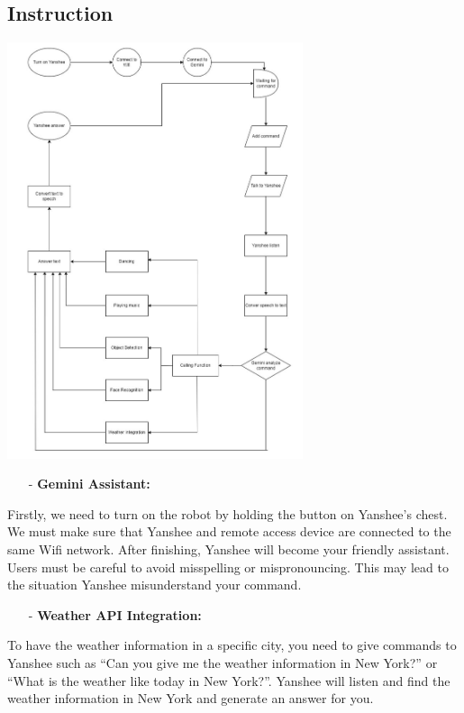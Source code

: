 \documentclass[12pt, a4paper]{article}
\begin{document}
\subsection{Instruction}
\begin{center}
    \includegraphics[width = 0.65\textwidth]{./image/4.png}
\end{center}
\begin{itemize}
    \item[-] \textbf{Gemini Assistant:}
\end{itemize}

Firstly, we need to turn on the robot by holding the button on Yanshee's chest. We must make sure that Yanshee and remote access device are connected to the same Wifi network. After finishing, Yanshee will become your friendly assistant. Users must be careful to avoid misspelling or mispronouncing. This may lead to the situation Yanshee misunderstand your command.

\begin{itemize}
    \item[-] \textbf{Weather API Integration:}
\end{itemize}

To have the weather information in a specific city, you need to give commands to Yanshee such as “Can you give me the weather information in New York?” or “What is the weather like today in New York?”. Yanshee will listen and find the weather information in New York and generate an answer for you.
\end{document}
